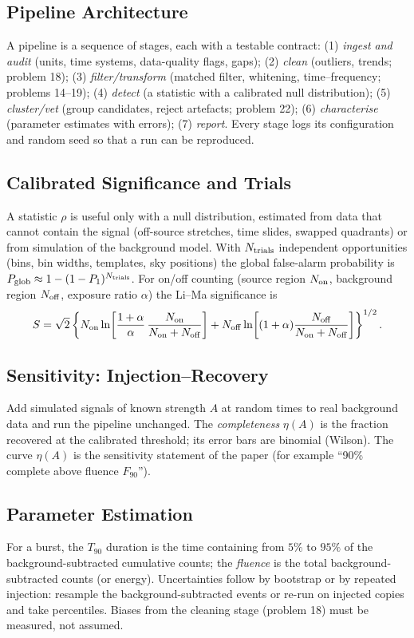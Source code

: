\documentclass[11pt,a4paper]{article}
\begin{document}
\subsection{Pipeline Architecture}
A pipeline is a sequence of stages, each with a testable contract: (1) \emph{ingest and audit} (units, time systems, data-quality flags, gaps); (2) \emph{clean} (outliers, trends; problem 18); (3) \emph{filter/transform} (matched filter, whitening, time--frequency; problems 14--19); (4) \emph{detect} (a statistic with a calibrated null distribution); (5) \emph{cluster/vet} (group candidates, reject artefacts; problem 22); (6) \emph{characterise} (parameter estimates with errors); (7) \emph{report}. Every stage logs its configuration and random seed so that a run can be reproduced.

\subsection{Calibrated Significance and Trials}
A statistic $\rho$ is useful only with a null distribution, estimated from data that cannot contain the signal (off-source stretches, time slides, swapped quadrants) or from simulation of the background model. With $N_{\rm trials}$ independent opportunities (bins, bin widths, templates, sky positions) the global false-alarm probability is $P_{\rm glob}\approx1-(1-P_1)^{N_{\rm trials}}$. For on/off counting (source region $N_{\rm on}$, background region $N_{\rm off}$, exposure ratio $\alpha$) the Li--Ma significance is
\begin{equation}
  S=\sqrt2\left\{N_{\rm on}\ln\!\left[\frac{1+\alpha}{\alpha}\,\frac{N_{\rm on}}{N_{\rm on}+N_{\rm off}}\right]+N_{\rm off}\ln\!\left[(1+\alpha)\frac{N_{\rm off}}{N_{\rm on}+N_{\rm off}}\right]\right\}^{1/2}.
  \label{eq:lima}
\end{equation}

\subsection{Sensitivity: Injection--Recovery}
Add simulated signals of known strength $A$ at random times to real background data and run the pipeline unchanged. The \emph{completeness} $\eta(A)$ is the fraction recovered at the calibrated threshold; its error bars are binomial (Wilson). The curve $\eta(A)$ is the sensitivity statement of the paper (for example ``90\% complete above fluence $F_{90}$'').

\subsection{Parameter Estimation}
For a burst, the \emph{$T_{90}$} duration is the time containing from $5\%$ to $95\%$ of the background-subtracted cumulative counts; the \emph{fluence} is the total background-subtracted counts (or energy). Uncertainties follow by bootstrap or by repeated injection: resample the background-subtracted events or re-run on injected copies and take percentiles. Biases from the cleaning stage (problem 18) must be measured, not assumed.
\end{document}
